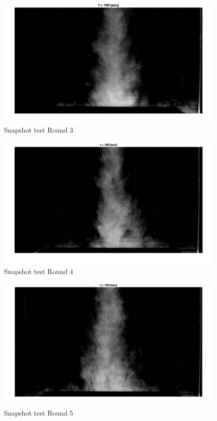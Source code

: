 \begin{figure}[ht!]
    \centering
    \includegraphics[width=\linewidth]{Images/Round_3_t100.jpg}
    \caption{Snapshot test Round 3}
\end{figure}

\begin{figure}[ht!]
    \centering
    \includegraphics[width=\linewidth]{Images/Round_4_t100.jpg}
    \caption{Snapshot test Round 4}
\end{figure}

\begin{figure}[ht!]
    \centering
    \includegraphics[width=\linewidth]{Images/Round_5_t100.jpg}
    \caption{Snapshot test Round 5}
\end{figure}







